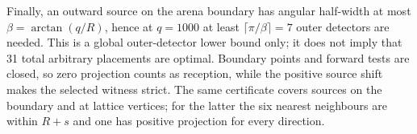 Finally, an outward source on the arena boundary has angular half-width at
most $\beta=\arctan(q/R)$, hence at $q=1000$ at least
$\lceil\pi/\beta\rceil=7$ outer detectors are needed.  This is a global
outer-detector lower bound only; it does not imply that 31 total arbitrary
placements are optimal.  Boundary points and forward tests are closed, so
zero projection counts as reception, while the positive source shift makes
the selected witness strict.  The same certificate covers sources on the
boundary and at lattice vertices; for the latter the six nearest neighbours
are within $R+s$ and one has positive projection for every direction.
